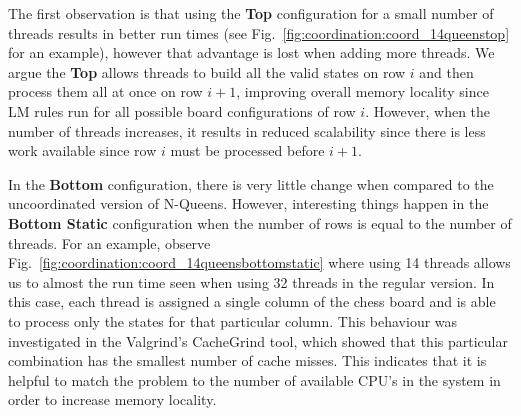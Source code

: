 The first
observation is that using the \textbf{Top} configuration for a small number of
threads results in better run times (see
Fig.~\ref{fig:coordination:coord_14queenstop} for an example), however that
advantage is lost when adding more threads. We argue the \textbf{Top} allows
threads to build all the valid states on row $i$ and then process them all
at once on row $i+1$, improving overall memory locality since LM rules run
for all possible board configurations of row $i$. However, when the number
of threads increases, it results in reduced scalability since there is less work
available since row $i$ must be processed before $i+1$.

In the \textbf{Bottom} configuration, there is very little change when compared
to the uncoordinated version of N-Queens. However, interesting things happen in
the \textbf{Bottom Static} configuration when the number of rows is equal to the
number of threads. For an example, observe
Fig.~\ref{fig:coordination:coord_14queensbottomstatic} where using 14 threads
allows us to almost the run time seen when using 32 threads in the regular
version. In this case, each thread is assigned a single column of the chess
board and is able to process only the states for that particular column. This
behaviour was investigated in the Valgrind's CacheGrind tool, which showed that
this particular combination has the smallest number of cache misses. This
indicates that it is helpful to match the problem to the number of available
CPU's in the system in order to increase memory locality.


